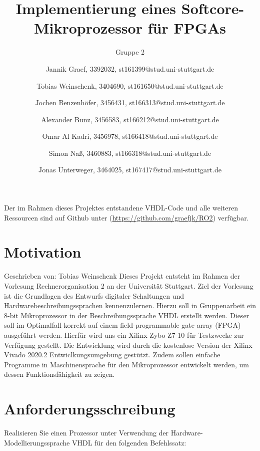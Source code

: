 \documentclass[bibliography=totoc,listof=totoc,index=totoc]{scrartcl}
\begin{document}
\title{Implementierung eines Softcore-Mikroprozessor für FPGAs}
\subtitle{Gruppe 2}
\author{Jannik Graef, 3392032, st161399@stud.uni-stuttgart.de \and
 Tobias Weinschenk, 3404690, st161650@stud.uni-stuttgart.de \and
 Jochen Benzenhöfer, 3456431, st166313@stud.uni-stuttgart.de \and
 Alexander Bunz, 3456583, st166212@stud.uni-stuttgart.de \and
 Omar Al Kadri, 3456978, st166418@stud.uni-stuttgart.de \and
 Simon Naß, 3460883, st166318@stud.uni-stuttgart.de \and
 Jonas Unterweger, 3464025, st167417@stud.uni-stuttgart.de}
\maketitle
\thispagestyle{empty} %
Der im Rahmen dieses Projektes entstandene VHDL-Code und alle weiteren Ressourcen sind auf Github unter (\url{https://github.com/graefjk/RO2}) verfügbar.
\newpage
\tableofcontents
\newpage
{} 
\section{Motivation}\label{sec:Motivation}
Geschrieben von: Tobias Weinschenk \newline
Dieses Projekt entsteht im Rahmen der Vorlesung Rechnerorganisation 2 an der Universität Stuttgart. Ziel der Vorlesung ist die Grundlagen des Entwurfs digitaler Schaltungen und Hardwarebeschreibungssprachen kennenzulernen. Hierzu soll in Gruppenarbeit ein 8-bit Mikroprozessor in der Beschreibungssprache VHDL erstellt werden. Dieser soll im Optimalfall korrekt auf einem \glqq field-programmable gate array\grqq $ $ (FPGA) ausgeführt werden. Hierfür wird uns ein Xilinx Zybo Z7-10 für Testzwecke zur Verfügung gestellt. Die Entwicklung wird durch die kostenlose Version der Xilinx Vivado 2020.2 Entwiclkungsumgebung gestützt. Zudem sollen einfache Programme in Maschinensprache für den Mikroprozessor entwickelt werden, um dessen Funktionsfähigkeit zu zeigen.

\section{Anforderungsschreibung}\label{sec:Anforderungsschreibung}
Realisieren Sie einen Prozessor unter Verwendung der Hardware-Modellierungssprache VHDL für den folgenden Befehlssatz:
\end{document}
